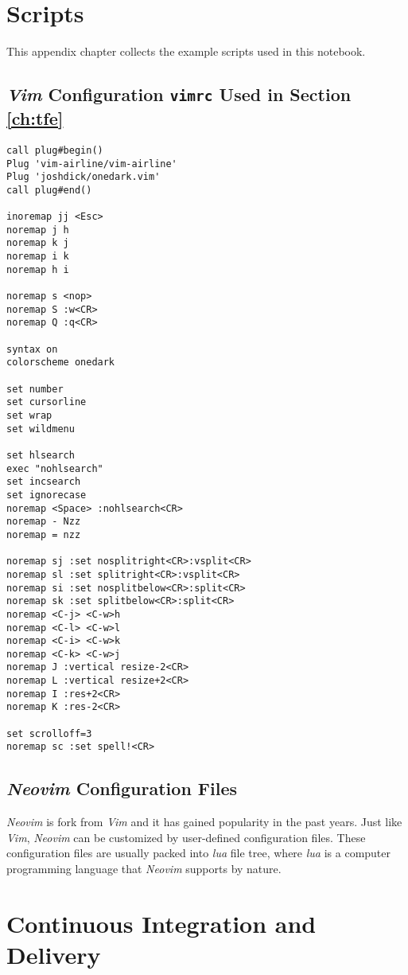 \chapter{Scripts}

This appendix chapter collects the example scripts used in this notebook.

\section{\textit{Vim} Configuration \texttt{vimrc} Used in Section \ref{ch:tfe}}

\begin{lstlisting}
call plug#begin()
Plug 'vim-airline/vim-airline'
Plug 'joshdick/onedark.vim'
call plug#end()

inoremap jj <Esc>
noremap j h
noremap k j
noremap i k
noremap h i

noremap s <nop>
noremap S :w<CR>
noremap Q :q<CR>

syntax on
colorscheme onedark

set number
set cursorline
set wrap
set wildmenu

set hlsearch
exec "nohlsearch"
set incsearch
set ignorecase
noremap <Space> :nohlsearch<CR>
noremap - Nzz
noremap = nzz

noremap sj :set nosplitright<CR>:vsplit<CR>
noremap sl :set splitright<CR>:vsplit<CR>
noremap si :set nosplitbelow<CR>:split<CR>
noremap sk :set splitbelow<CR>:split<CR>
noremap <C-j> <C-w>h
noremap <C-l> <C-w>l
noremap <C-i> <C-w>k
noremap <C-k> <C-w>j
noremap J :vertical resize-2<CR>
noremap L :vertical resize+2<CR>
noremap I :res+2<CR>
noremap K :res-2<CR>

set scrolloff=3
noremap sc :set spell!<CR>
\end{lstlisting}

\section{\textit{Neovim} Configuration Files}

\textit{Neovim} is fork from \textit{Vim} and it has gained popularity in the past years. Just like \textit{Vim}, \textit{Neovim} can be customized by user-defined configuration files. These configuration files are usually packed into \textit{lua} file tree, where \textit{lua} is a computer programming language that \textit{Neovim} supports by nature.

\chapter{Continuous Integration and Delivery} \label{ch:cicd}

